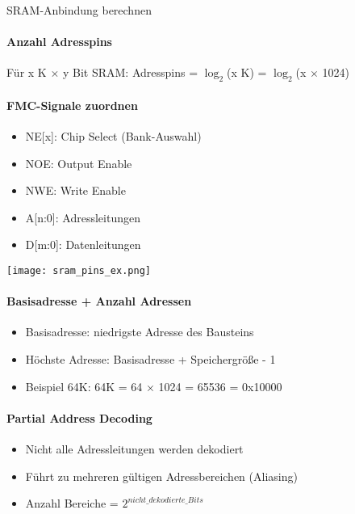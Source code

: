 \begin{concept}{SRAM-Anbindung berechnen}
    \paragraph{Anzahl Adresspins}
    Für x K $\times$ y Bit SRAM: Adresspins = $\log_2$(x K) = $\log_2$(x $\times$ 1024)

    \paragraph{FMC-Signale zuordnen}

    \begin{minipage}{0.65\linewidth}
    \begin{itemize}
        \item NE[x]: Chip Select (Bank-Auswahl)
        \item NOE: Output Enable
        \item NWE: Write Enable
        \item A[n:0]: Adressleitungen
        \item D[m:0]: Datenleitungen
    \end{itemize}
    \end{minipage}
    \begin{minipage}{0.3\linewidth}
    \texttt{[image: sram\_pins\_ex.png]}
    \end{minipage}
    


    \paragraph{Basisadresse + Anzahl Adressen}
    \begin{itemize}
        \item Basisadresse: niedrigste Adresse des Bausteins
        \item Höchste Adresse: Basisadresse + Speichergröße - 1
        \item Beispiel 64K: 64K = 64 $\times$ 1024 = 65536 = 0x10000
    \end{itemize}
    
    \paragraph{Partial Address Decoding}
    \begin{itemize}
        \item Nicht alle Adressleitungen werden dekodiert
        \item Führt zu mehreren gültigen Adressbereichen (Aliasing)
        \item Anzahl Bereiche = $2^{nicht\_dekodierte\_Bits}$
    \end{itemize}
    
    
\end{concept}

